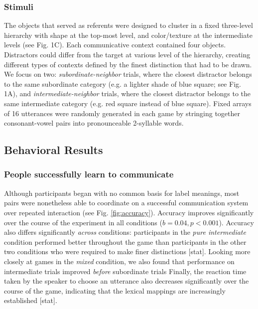 \documentclass[10pt,letterpaper]{article}
\begin{document}
\subsubsection{Stimuli}
The objects that served as referents were designed to cluster in a fixed three-level hierarchy with shape at the top-most level, and color/texture at the intermediate levels (see Fig. 1C). Each communicative context contained four objects. Distractors could differ from the target at various level of the hierarchy, creating different types of contexts defined by the finest distinction that had to be drawn. We focus on two: \emph{subordinate-neighbor} trials, where the closest distractor belongs to the same subordinate category (e.g. a lighter shade of blue square; see Fig. 1A), and \emph{intermediate-neighbor} trials, where the closest distractor belongs to the same intermediate category (e.g. red square instead of blue square). Fixed arrays of 16 utterances were randomly generated in each game by stringing together consonant-vowel pairs into pronounceable 2-syllable words.

\subsection{Behavioral Results}

\subsubsection{People successfully learn to communicate}

Although participants began with no common basis for label meanings, most pairs were nonetheless able to coordinate on a successful communication system over repeated interaction (see Fig. \ref{fig:accuracy}). 
Accuracy improves significantly over the course of the experiment in all conditions ($b = 0.04, p < 0.001$). 
Accuracy also differs significantly \emph{across} conditions: participants in the \emph{pure intermediate} condition performed better throughout the game than participants in the other two conditions who were required to make finer distinctions [stat]. 
Looking more closely at games in the \emph{mixed} condition, we also found that performance on intermediate trials improved \emph{before} subordinate trials %
Finally, the reaction time taken by the speaker to choose an utterance also decreases significantly over the course of the game, indicating that the lexical mappings are increasingly established [stat]. 
\end{document}
